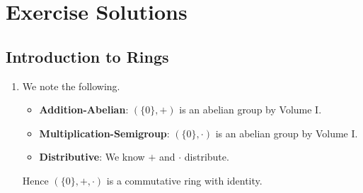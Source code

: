 \chapter{Exercise Solutions}
\section{Introduction to Rings}
\begin{enumerate}
    \item We note the following.
    \begin{itemize}
        \item \textbf{Addition-Abelian}: $(\{0\}, +)$ is an abelian group by Volume I.
        \item \textbf{Multiplication-Semigroup}: $(\{0\}, \cdot)$ is an abelian group by Volume I.
        \item \textbf{Distributive}: We know $+$ and $\cdot$ distribute.
    \end{itemize}
    Hence $(\{0\}, +, \cdot)$ is a commutative ring with identity.
\end{enumerate}

